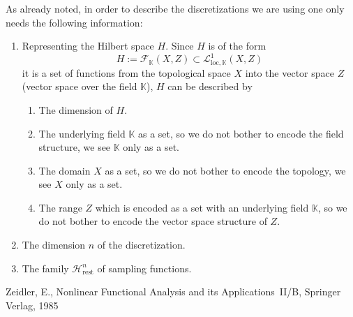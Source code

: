 \documentclass[a4paper]{article}
\newcommand{\cH}{\mathcal{H}}
\newcommand{\loc}{\text{loc}}
\newcommand{\cF}{\mathcal{F}}
\newcommand{\cL}{\mathcal{L}}
\newcommand{\K}{\mathbb{K}}
\newcommand{\rest}{\text{rest}}
\begin{document}
As already noted, in order to describe the discretizations we are using 
one only needs the following information:
\begin{enumerate}
\item Representing the Hilbert space $H$. Since $H$ is of the form
  \[ H:=\cF_{\K}(X,Z)\subset \cL^1_{\loc,\K}(X,Z) \] 
  it is a set of functions from the topological space $X$ into the 
  vector space $Z$ (vector space over the field $\K$), $H$ can be described by 
  \begin{enumerate}
  \item The dimension of $H$.
  \item The underlying field $\K$  as a set, so we do not bother to encode 
    the field structure, we see $\K$ only as a set.
  \item The domain $X$ as a set, so we do not bother to encode the
    topology, we see $X$ only as a set. 
  \item The range $Z$ which is encoded as a set with an underlying 
   field $\K$, so we do not bother to encode 
   the vector space structure of $Z$.
  \end{enumerate}
\item The dimension $n$ of the discretization.
\item The family $\cH^n_{\rest}$ of sampling functions.
\end{enumerate}

\begin{thebibliography}{99}
 Zeidler, E., Nonlinear Functional Analysis and its 
  Applications~II/B, Springer Verlag, 1985
\end{thebibliography}  
\end{document}
